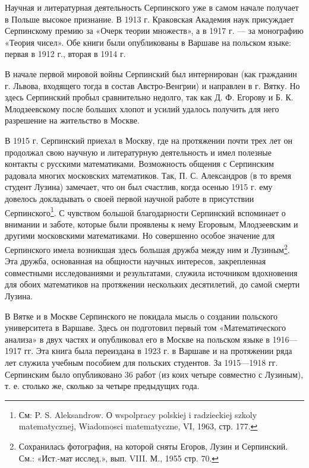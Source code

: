 \documentclass[12pt, a4paper, openany]{book}
\begin{document}
Научная и литературная деятельность Серпинского уже в самом начале получает в Польше высокое признание. В 1913 г. Краковская Академия наук присуждает Серпинскому премию за «Очерк теории множеств», а в 1917 г. — за монографию «Теория чисел». Обе книги были опубликованы в Варшаве на польском языке: первая в 1912 г., вторая в 1914 г.

В начале первой мировой войны Серпинский был интернирован (как гражданин г. Львова, входящего тогда в состав Австро-Венгрии) и направлен в г. Вятку. Но здесь Серпинский пробыл сравнительно недолго, так как Д. Ф. Егорову и Б. К. Млодзеевскому после больших хлопот и усилий удалось получить для него разрешение на жительство в Москве.

В 1915 г. Серпинский приехал в Москву, где на протяжении почти трех лет он продолжал свою научную и литературную деятельность и имел полезные контакты с русскими математиками. Возможность общения с Серпинским радовала многих московских математиков. Так, П. С. Александров (в то время студент Лузина) замечает, что он был счастлив, когда осенью 1915 г. ему довелось докладывать о своей первой научной работе в присутствии Серпинского{\footnote{См: P. S. Aleksandrow. О wspolpracy polskiej i radzieckiej szkoly matematycznej, Wiadomosci matematyczne, VI, 1963, стр. 177.
}}. С чувством большой благодарности Серпинский вспоминает о внимании и заботе, которые были проявлены к нему Егоровым, Млодзеевским и другими московскими математиками. Но совершенно особое значение для Серпинского имела возникшая здесь большая дружба между ним и Лузиным{\footnote{Сохранилась фотография, на которой сняты Егоров, Лузин и Серпинский. См.: «Ист.-мат исслед.», вып. VIII. М., 1955 стр. 70.}}. Эта дружба, основанная на общности научных интересов, закрепленная совместными исследованиями и результатами, служила источником вдохновения для обоих математиков на протяжении нескольких десятилетий, до самой смерти Лузина.

В Вятке и в Москве Серпинского не покидала мысль о создании польского университета в Варшаве. Здесь он подготовил первый том «Математического анализа» в двух частях и опубликовал его в Москве на польском языке в 1916—1917 гг. Эта книга была переиздана в 1923 г. в Варшаве и на протяжении ряда лет служила учебным пособием для польских студентов. За 1915—1918 гг. Серпинским было опубликовано 36 работ (из коих четыре совместно с Лузиным), т. е. столько же, сколько за четыре предыдущих года.
\end{document}
